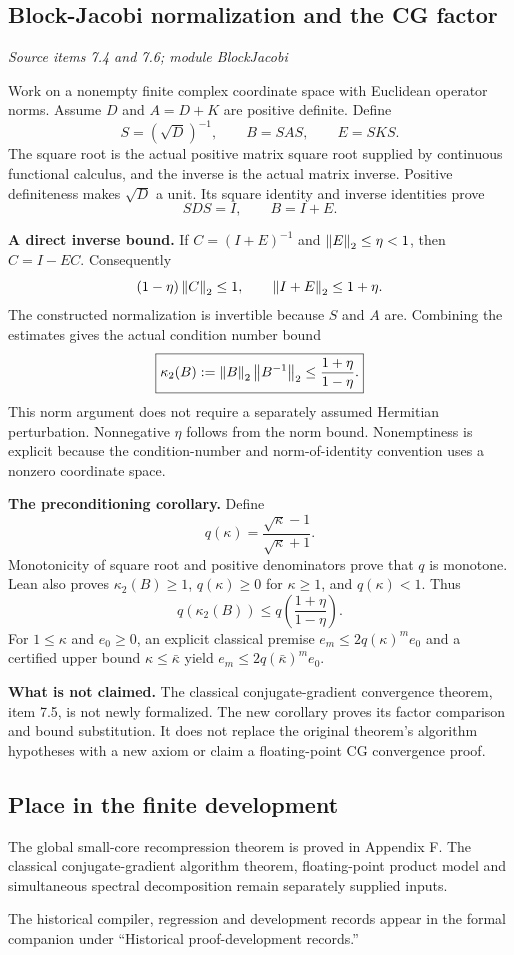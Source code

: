 \subsection{Block-Jacobi normalization and the CG factor}\label{supp5:subsection:006}\textit{Source items 7.4 and 7.6; module BlockJacobi}\par
Work on a nonempty finite complex coordinate space with Euclidean operator norms. Assume $D$ and $A=D+K$ are positive definite. Define
\[
S=(\sqrt D)^{-1},\qquad B=SAS,\qquad E=SKS.
\]
The square root is the actual positive matrix square root supplied by continuous functional calculus, and the inverse is the actual matrix inverse. Positive definiteness makes $\sqrt D$ a unit. Its square identity and inverse identities prove
\[
SDS=I,\qquad B=I+E.
\]

\textbf{A direct inverse bound.} If $C=(I+E)^{-1}$ and $\left\lVert E\right\rVert_2\leq\eta<1$, then $C=I-EC$. Consequently
\[
(1-\eta)\left\lVert C\right\rVert_2\leq 1,
\qquad \left\lVert I+E\right\rVert_2\leq 1+\eta.
\]
The constructed normalization is invertible because $S$ and $A$ are. Combining the estimates gives the actual condition number bound
\[
\boxed{\kappa_2(B):=\left\lVert B\right\rVert_2\left\lVert B^{-1}\right\rVert_2
\leq\frac{1+\eta}{1-\eta}.}
\]
This norm argument does not require a separately assumed Hermitian perturbation. Nonnegative $\eta$ follows from the norm bound. Nonemptiness is explicit because the condition-number and norm-of-identity convention uses a nonzero coordinate space.

\textbf{The preconditioning corollary.} Define
\[
q(\kappa)=\frac{\sqrt\kappa-1}{\sqrt\kappa+1}.
\]
Monotonicity of square root and positive denominators prove that $q$ is monotone. Lean also proves $\kappa_2(B)\geq1$, $q(\kappa)\geq0$ for $\kappa\geq1$, and $q(\kappa)<1$. Thus
\[
\boxed{q(\kappa_2(B))\leq q\!\left(\frac{1+\eta}{1-\eta}\right).}
\]
For $1\leq\kappa$ and $e_0\geq0$, an explicit classical premise $e_m\leq2q(\kappa)^m e_0$ and a certified upper bound $\kappa\leq\bar\kappa$ yield $e_m\leq2q(\bar\kappa)^m e_0$.

\textbf{What is not claimed.} The classical conjugate-gradient convergence theorem, item 7.5, is not newly formalized. The new corollary proves its factor comparison and bound substitution. It does not replace the original theorem's algorithm hypotheses with a new axiom or claim a floating-point CG convergence proof.



\subsection{Place in the finite development}\label{supp5:subsection:007}
The global small-core recompression theorem is proved in Appendix F. The classical conjugate-gradient algorithm theorem, floating-point product model and simultaneous spectral decomposition remain separately supplied inputs.

The historical compiler, regression and development records appear in the formal companion under ``Historical proof-development records.''
